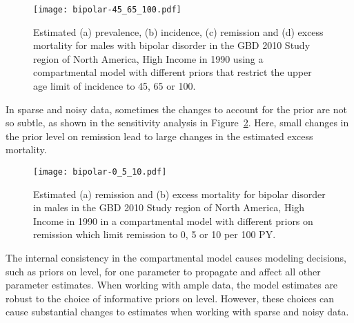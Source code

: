     \begin{figure}[h]
        \begin{center}
            \texttt{[image: bipolar-45\_65\_100.pdf]}
            \caption{Estimated (a) prevalence, (b) incidence, (c) remission and
              (d) excess mortality for males with bipolar
              disorder in the GBD 2010 Study region of North America, High Income
              in 1990 using a compartmental model with
              different priors that restrict the upper age limit of
              incidence to 45, 65 or 100.}
            \label{fig:app-bipolar onset}
        \end{center}
    \end{figure}

In sparse and noisy data, sometimes the changes to account for the prior
are not so subtle, as shown in the sensitivity analysis in
Figure~\ref{fig:app-bipolar remission}.  Here, small changes in the
prior level on remission lead to large changes in the estimated excess mortality.

    \begin{figure}[h]
        \begin{center}
            \texttt{[image: bipolar-0\_5\_10.pdf]}
            \caption{Estimated (a) remission and (b) excess
              mortality for bipolar disorder in
              males in the GBD 2010 Study region of North America, High Income
              in 1990 in a compartmental model
              with different priors on remission which limit remission
              to 0, 5 or 10 per 100 PY.}
            \label{fig:app-bipolar remission}
        \end{center}
    \end{figure}

The internal consistency in the compartmental model causes modeling
decisions, such as priors on level, for one parameter to propagate and
affect all other parameter estimates.  When working with ample data,
the model estimates are robust to the choice of informative priors on
level.  However, these choices can cause substantial changes to
estimates when working with sparse and noisy data.




